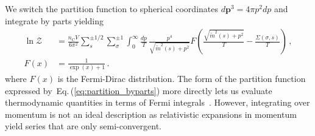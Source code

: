 \documentclass[epjST]{svjour}
\newcommand{\req}[1]{Eq.\,(\ref{#1})}
\begin{document}
We switch the partition function to spherical coordinates \(d\mathbf{p}^{3}=4\pi p^{2}dp\) and {\color{blue} integrate by parts yielding
\begin{align}
\label{eq:partition_byparts}
\ln\mathcal{Z} &= \frac{n_\mathrm{C}V}{6\pi^{2}} \sum_{s}^{\pm1/2}\sum_{\sigma}^{\pm1}\int_{0}^{\infty} \frac{dp}{T} \, \frac{p^4}{\sqrt{\tilde{m}^2(s)+p^{2}}}F\left(\frac{\sqrt{\tilde{m}^2(s)+p^{2}}}{T} - \frac{\Sigma(\sigma,s)}{T}\right)\,,\\
\label{eq:FermiDirac}
F\left(x\right) &= \frac{1}{\exp{(x)} + 1}\,.
\end{align}
}where \(F(x)\) is the Fermi-Dirac distribution. The form of the partition function expressed by~\req{eq:partition_byparts} more directly lets us evaluate thermodynamic quantities in terms of Fermi integrals~\cite{Elze:1980er,Birrell:2024bdb}. However, integrating over momentum is not an ideal description as relativistic expansions in momentum yield series that are only semi-convergent. 
\end{document}
